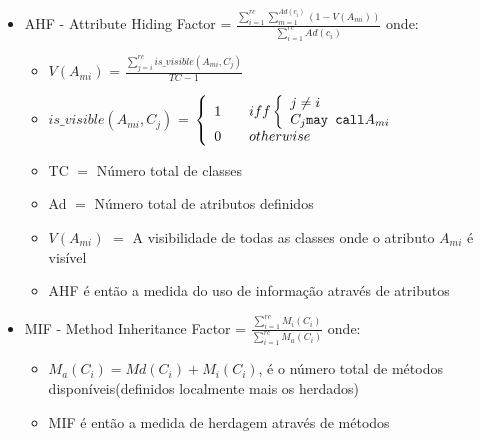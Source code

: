 \begin{description}
\begin{itemize}
\begin{itemize}
																				    \end{itemize}
				   \item AHF - Attribute Hiding Factor = $ \frac{\sum_{i=1}^{rc} \sum_{m=1}^{Ad(c_i)} (1-V(A_{mi}))} {\sum_{i=1}^{rc} Ad(c_i)} $ onde: \begin{itemize}
																				      \item $V(A_{mi})$ = $\frac{\sum_{j=i}^{rc} is\_visible(A_{mi},C_j)}{TC-1} $
																				      \item $ is\_visible(A_{mi},C_j) $ = \( \left \{ \begin{array}{l l}
																									      1 & \quad iff \left \{ \begin{array}{l l}
																									                              j \neq i \\
																												      C_j \texttt{may call} A_{mi}\\
																									                             \end{array}
\right.\\
																									      0 & \quad otherwise\\
																									    \end{array} \right. \)
																				      \item TC $=$ Número total de classes
																				      \item Ad $=$ Número total de atributos definidos
																				      \item $V(A_{mi})$ $=$ A visibilidade de todas as classes onde o atributo $A_{mi}$ é visível
																				      \item AHF é então a medida do uso de informação através de atributos
																				    \end{itemize}
				   \item MIF - Method Inheritance Factor = $ \frac{\sum_{i=1}^{rc} M_i(C_i)}{\sum_{i=1}^{rc} M_a(C_i)} $ onde: \begin{itemize}
				                                                                                                                \item $ M_a(C_i) = Md(C_i) + M_i(C_i)$, é o número total de métodos disponíveis(definidos localmente mais os herdados)
				                                                                                                                \item MIF é então a medida de herdagem através de métodos
				                                                                                                               \end{itemize}

\end{itemize}
\end{description}

